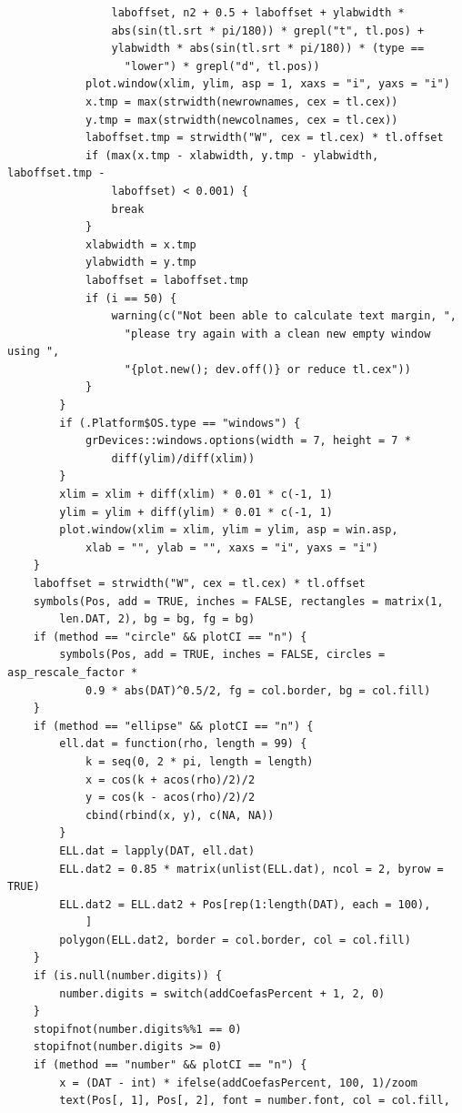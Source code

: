 \documentclass[
]{article}
\begin{document}
\begin{verbatim}
                laboffset, n2 + 0.5 + laboffset + ylabwidth * 
                abs(sin(tl.srt * pi/180)) * grepl("t", tl.pos) + 
                ylabwidth * abs(sin(tl.srt * pi/180)) * (type == 
                  "lower") * grepl("d", tl.pos))
            plot.window(xlim, ylim, asp = 1, xaxs = "i", yaxs = "i")
            x.tmp = max(strwidth(newrownames, cex = tl.cex))
            y.tmp = max(strwidth(newcolnames, cex = tl.cex))
            laboffset.tmp = strwidth("W", cex = tl.cex) * tl.offset
            if (max(x.tmp - xlabwidth, y.tmp - ylabwidth, laboffset.tmp - 
                laboffset) < 0.001) {
                break
            }
            xlabwidth = x.tmp
            ylabwidth = y.tmp
            laboffset = laboffset.tmp
            if (i == 50) {
                warning(c("Not been able to calculate text margin, ", 
                  "please try again with a clean new empty window using ", 
                  "{plot.new(); dev.off()} or reduce tl.cex"))
            }
        }
        if (.Platform$OS.type == "windows") {
            grDevices::windows.options(width = 7, height = 7 * 
                diff(ylim)/diff(xlim))
        }
        xlim = xlim + diff(xlim) * 0.01 * c(-1, 1)
        ylim = ylim + diff(ylim) * 0.01 * c(-1, 1)
        plot.window(xlim = xlim, ylim = ylim, asp = win.asp, 
            xlab = "", ylab = "", xaxs = "i", yaxs = "i")
    }
    laboffset = strwidth("W", cex = tl.cex) * tl.offset
    symbols(Pos, add = TRUE, inches = FALSE, rectangles = matrix(1, 
        len.DAT, 2), bg = bg, fg = bg)
    if (method == "circle" && plotCI == "n") {
        symbols(Pos, add = TRUE, inches = FALSE, circles = asp_rescale_factor * 
            0.9 * abs(DAT)^0.5/2, fg = col.border, bg = col.fill)
    }
    if (method == "ellipse" && plotCI == "n") {
        ell.dat = function(rho, length = 99) {
            k = seq(0, 2 * pi, length = length)
            x = cos(k + acos(rho)/2)/2
            y = cos(k - acos(rho)/2)/2
            cbind(rbind(x, y), c(NA, NA))
        }
        ELL.dat = lapply(DAT, ell.dat)
        ELL.dat2 = 0.85 * matrix(unlist(ELL.dat), ncol = 2, byrow = TRUE)
        ELL.dat2 = ELL.dat2 + Pos[rep(1:length(DAT), each = 100), 
            ]
        polygon(ELL.dat2, border = col.border, col = col.fill)
    }
    if (is.null(number.digits)) {
        number.digits = switch(addCoefasPercent + 1, 2, 0)
    }
    stopifnot(number.digits%%1 == 0)
    stopifnot(number.digits >= 0)
    if (method == "number" && plotCI == "n") {
        x = (DAT - int) * ifelse(addCoefasPercent, 100, 1)/zoom
        text(Pos[, 1], Pos[, 2], font = number.font, col = col.fill, 

\end{verbatim}
\end{document}
